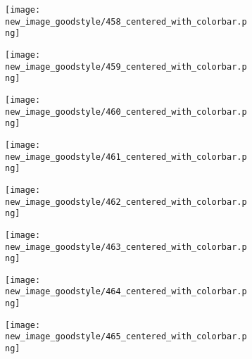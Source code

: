 \documentclass[a4paper,12pt]{article}
\begin{document}
\begin{figure}[H]
  \begin{subfigure}{0.11\textwidth}
    \texttt{[image: new\_image\_goodstyle/458\_centered\_with\_colorbar.png]}
  \end{subfigure}
  \hfill
  \begin{subfigure}{0.11\textwidth}
    \texttt{[image: new\_image\_goodstyle/459\_centered\_with\_colorbar.png]}
  \end{subfigure}
  \hfill
  \begin{subfigure}{0.11\textwidth}
    \texttt{[image: new\_image\_goodstyle/460\_centered\_with\_colorbar.png]}
  \end{subfigure}
  \hfill
  \begin{subfigure}{0.11\textwidth}
    \texttt{[image: new\_image\_goodstyle/461\_centered\_with\_colorbar.png]}
  \end{subfigure}
  \hfill
  \begin{subfigure}{0.11\textwidth}
    \texttt{[image: new\_image\_goodstyle/462\_centered\_with\_colorbar.png]}
  \end{subfigure}
  \hfill
  \begin{subfigure}{0.11\textwidth}
    \texttt{[image: new\_image\_goodstyle/463\_centered\_with\_colorbar.png]}
  \end{subfigure}
  \hfill
  \begin{subfigure}{0.11\textwidth}
    \texttt{[image: new\_image\_goodstyle/464\_centered\_with\_colorbar.png]}
  \end{subfigure}
  \hfill
  \begin{subfigure}{0.11\textwidth}
    \texttt{[image: new\_image\_goodstyle/465\_centered\_with\_colorbar.png]}
  \end{subfigure}
  \hfill
\end{figure}
\end{document}
